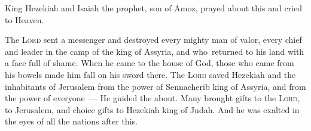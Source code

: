 \begin{inparaenum}
   King Hezekiah and Isaiah the prophet, son of Amoz, prayed about this and cried to Heaven.%
  
   The \textsc{Lord} sent a messenger and destroyed every mighty man of valor, every chief and leader in the camp of the king of Assyria, and who\understood\ returned to his land with a face full of shame. When he came to the house of God, those who came from his bowels made him fall on his sword there.%
   The \textsc{Lord} saved Hezekiah and the inhabitants of Jerusalem from the power of Sennacherib king of Assyria, and from the power of everyone~--- He guided the about.%
   Many brought gifts to the \textsc{Lord}, to Jerusalem, and choice gifts to Hezekiah king of Judah. And he was exalted in the eyes of all the nations after this.%
  

\end{inparaenum}
